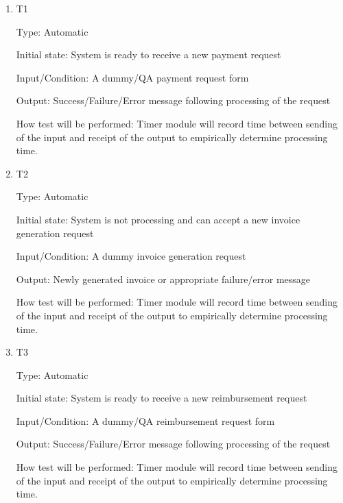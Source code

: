 \documentclass[12pt, titlepage]{article}
\begin{document}
\begin{enumerate}

\item{T1\\}

Type: Automatic

Initial state: System is ready to receive a new payment request

Input/Condition: A dummy/QA payment request form

Output: Success/Failure/Error message following processing of the request

How test will be performed: Timer module will record time between sending of the input and receipt of the output to empirically determine processing time.
 
					
\item{T2\\}

Type: Automatic

Initial state: System is not processing and can accept a new invoice generation request

Input/Condition: A dummy invoice generation request

Output: Newly generated invoice or appropriate failure/error message

How test will be performed: Timer module will record time between sending of the input and receipt of the output to empirically determine processing time.

\item{T3\\}

Type: Automatic

Initial state: System is ready to receive a new reimbursement request

Input/Condition: A dummy/QA reimbursement request form

Output: Success/Failure/Error message following processing of the request

How test will be performed: Timer module will record time between sending of the input and receipt of the output to empirically determine processing time.

\end{enumerate}

\end{document}
